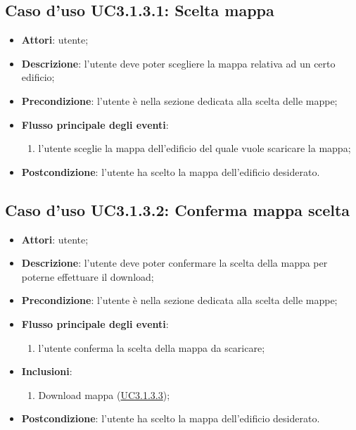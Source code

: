 \documentclass[../AnalisiDeiRequisiti.tex]{subfiles}
\begin{document}
\subsection{Caso d'uso UC3.1.3.1: Scelta mappa}
\begin{itemize}
\item \textbf{Attori}: utente;
\item \textbf{Descrizione}: l'utente deve poter scegliere la mappa relativa ad un certo edificio; 
      \item \textbf{Precondizione}: l'utente è nella sezione dedicata alla scelta delle mappe;

        \item \textbf{Flusso principale degli eventi}:
          \begin{enumerate}
          \item l'utente sceglie la mappa dell'edificio del quale vuole scaricare la mappa;

      \end{enumerate}
    \item \textbf{Postcondizione}: l'utente ha scelto la mappa dell'edificio desiderato.
  \end{itemize}
\hypertarget{UC3.1.3.2}{}
\subsection{Caso d'uso UC3.1.3.2: Conferma mappa scelta}
\begin{itemize}
\item \textbf{Attori}: utente;
\item \textbf{Descrizione}: l'utente deve poter confermare la scelta della mappa per poterne effettuare il download; 
      \item \textbf{Precondizione}: l'utente è nella sezione dedicata alla scelta delle mappe;

        \item \textbf{Flusso principale degli eventi}:
          \begin{enumerate}
          \item l'utente conferma la scelta della mappa da scaricare;        

      \end{enumerate}
    \item \textbf{Inclusioni}:
      \begin{enumerate}
          \item Download mappa (\hyperlink{UC3.1.3.3}{UC3.1.3.3});

      \end{enumerate}

    \item \textbf{Postcondizione}: l'utente ha scelto la mappa dell'edificio desiderato.
  \end{itemize}
\hypertarget{UC3.1.3.3}{}
\end{document}
